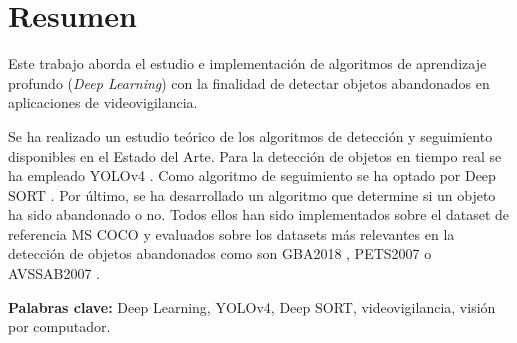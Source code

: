 
\chapter*{Resumen}
\label{cha:resumen}


Este trabajo aborda el estudio e implementación de algoritmos de aprendizaje profundo (\textit{Deep Learning}) con la finalidad de detectar objetos abandonados en aplicaciones de videovigilancia.

Se ha realizado un estudio teórico de los algoritmos de detección y seguimiento disponibles en el Estado del Arte. Para la detección de objetos en tiempo real se ha empleado YOLOv4 \cite{bochkovskiy2020yolov4}. Como algoritmo de seguimiento se ha optado por Deep SORT \cite{Wojke2017simple}. Por último, se ha desarrollado un algoritmo que determine si un objeto ha sido abandonado o no. Todos ellos han sido implementados sobre el dataset de referencia MS COCO \cite{lin2015microsoft} y evaluados sobre los datasets más relevantes en la detección de objetos abandonados como son GBA2018 \cite{gba-dataset}, PETS2007 \cite{pets2007-dataset} o AVSSAB2007 \cite{AVSSAB2007-dataset}.

\textbf{Palabras clave:} Deep Learning, YOLOv4, Deep SORT, videovigilancia, visión por computador.